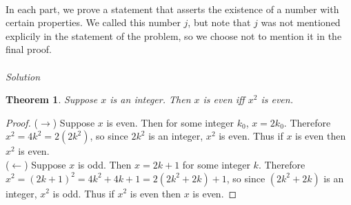 \documentclass{report}
\newtheorem*{theorem}{Theorem}
\theoremstyle{definition}
\begin{document}
\vspace{1mm}\\
In each part, we prove a statement that asserts the existence
of a number with certain properties. We called this number $j$, but note that $j$ was not mentioned explicily in the statement of the problem, so we choose not to mention it in the final proof.\\
\vspace{1mm}\\
\textit{Solution}
\begin{theorem}
Suppose $x$ is an integer. Then $x$ is even iff $x^2$ is even.
\end{theorem}
\begin{proof}($\rightarrow$) Suppose $x$ is even. Then for some integer $k_0$, $x=2k_0$. Therefore $x^2=4k^2=2(2k^2)$, so since $2k^2$ is an integer, $x^2$ is even. 
Thus if $x$ is even then $x^2$ is even.\\
\indent($\leftarrow$) Suppose $x$ is odd. Then $x=2k+1$ for some integer $k$. Therefore $x^2=(2k+1)^2=4k^2+4k+1=2(2k^2+2k)+1$, so since $(2k^2+2k)$ is an integer, $x^2$ is odd. Thus if 
$x^2$ is even then $x$ is even.
\end{proof}
\newpage
\end{document}
